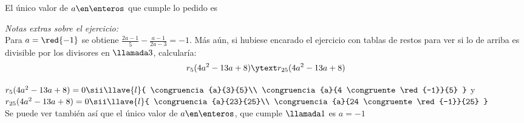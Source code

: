 El único valor de $a \en \enteros$ que cumple lo pedido es 

\separadorCorto

\textit{Notas extras sobre el ejercicio:}\\
Para $a = \red{-1}$ se obtiene $\frac{2a - 1}{5} - \frac{a - 1}{2a - 3} = -1$. Más aún, si hubiese encarado el
ejercicio con tablas de restos para ver si lo de arriba es divisible por los divisores en $\llamada3$, calcularía:
$$
r_5(4a^2 -13a + 8) \ytext r_{25}(4a^2 -13a + 8)
$$

$
	r_5 (4a^2 -13a + 8) = 0
	\sii
	\llave{l}{
		\congruencia{a}{3}{5}\\
		\congruencia{a}{4 \congruente \red{-1}}{5}
	}
$
y\quad
$
    r_{25} (4a^2 -13a + 8) = 0
	\sii
	\llave{l}{
		\congruencia{a}{23}{25}\\
        \congruencia{a}{24 \congruente \red{-1}}{25}
	}$\\
Se puede ver también así que el único valor de $a \en \enteros$,
que cumple $\llamada1$ es $a = -1$



